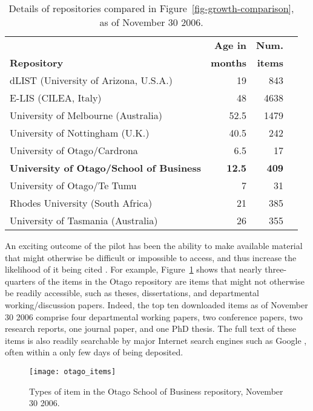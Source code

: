 \documentclass[12pt,pdftex,a4paper,titlepage]{article}
\begin{document}
\begin{table}
	\caption{Details of repositories compared in Figure~\ref{fig-growth-comparison}, as of November 30 2006.}
	\label{tab-repositories}
	\begin{center}
		\begin{tabular}{lrrl}
															&	\textbf{Age in}	&	\textbf{Num.}	\\
			\textbf{Repository}								&	\textbf{months}	&	\textbf{items}	\\
			\hline
			dLIST (University of Arizona, U.S.A.)			&	19				&	843	\\
			E-LIS (CILEA, Italy)							&	48				&	4638	\\
			University of Melbourne (Australia)				&	52.5			&	1479	\\
			University of Nottingham (U.K.)					&	40.5			&	242	\\
			University of Otago/Cardrona					&	6.5				&	17	\\
			\textbf{University of Otago/School of Business}	&	\textbf{12.5}	&	\textbf{409}	\\
			University of Otago/Te Tumu						&	7				&	31	\\
			Rhodes University (South Africa)				&	21				&	385	\\
			University of Tasmania (Australia)				&	26				&	355	\\
		\end{tabular}
	\end{center}
\end{table}


An exciting outcome of the pilot has been the ability to make available material that might otherwise be difficult or impossible to access, and thus increase the likelihood of it being cited \cite{Harn-S-2005-research,Hajj-C-2005-citation}. For example, Figure~\ref{fig-item-types} shows that nearly three-quarters of the items in the Otago repository are items that might not otherwise be readily accessible, such as theses, dissertations, and departmental working/discussion papers. Indeed, the top ten downloaded items as of November 30 2006 comprise four departmental working papers, two conference papers, two research reports, one journal paper, and one PhD thesis. The full text of these items is also readily searchable by major Internet search engines such as Google \cite{Sale-A-2006-OAchapter}, often within a only few days of being deposited.


\begin{figure}
	\centering
	\texttt{[image: otago\_items]}
	\caption{Types of item in the Otago School of Business repository, November 30 2006.}
	\label{fig-item-types}
\end{figure}
\end{document}
